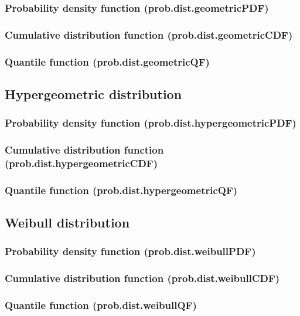 \documentclass{article}
\theoremstyle{definition}
\begin{document}
\subsubsection{Probability density function (prob.dist.geometricPDF)}
\subsubsection{Cumulative distribution function (prob.dist.geometricCDF)}
\subsubsection{Quantile function (prob.dist.geometricQF)}

\subsection{Hypergeometric distribution}
\subsubsection{Probability density function (prob.dist.hypergeometricPDF)}
\subsubsection{Cumulative distribution function (prob.dist.hypergeometricCDF)}
\subsubsection{Quantile function (prob.dist.hypergeometricQF)}

\subsection{Weibull distribution}
\subsubsection{Probability density function (prob.dist.weibullPDF)}
\subsubsection{Cumulative distribution function (prob.dist.weibullCDF)}
\subsubsection{Quantile function (prob.dist.weibullQF)}
\end{document}
